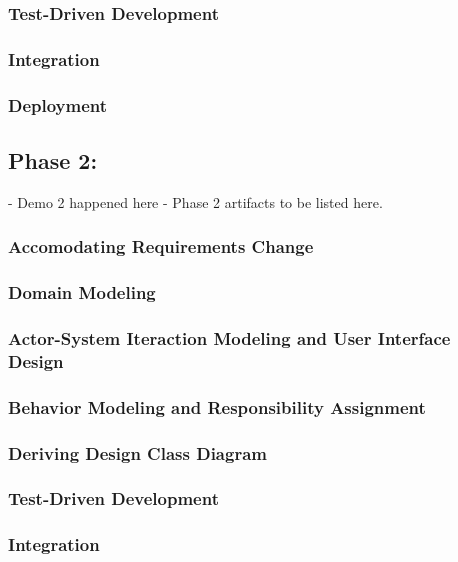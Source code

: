 \documentclass[11pt]{article}
\begin{document}
\subsubsection{Test-Driven Development}
 
\subsubsection{Integration}
 
\subsubsection{Deployment}

\subsection{Phase 2:} 
 - Demo 2 happened here
 - Phase 2 artifacts to be listed here.

\subsubsection{Accomodating Requirements Change}
 
\subsubsection{Domain Modeling}
  
\subsubsection{Actor-System Iteraction Modeling and User Interface Design}
  
\subsubsection{Behavior Modeling and Responsibility Assignment}
  
\subsubsection{Deriving Design Class Diagram}
  
\subsubsection{Test-Driven Development}
  
\subsubsection{Integration}
  
\end{document}
